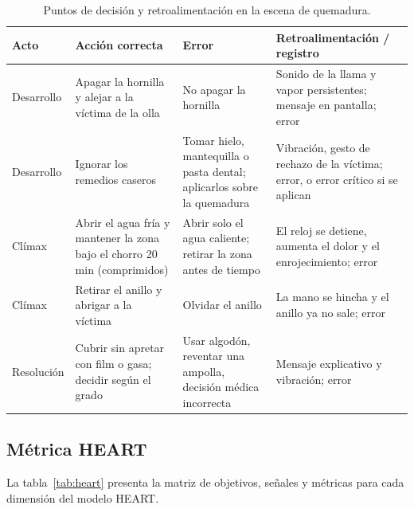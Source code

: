 \documentclass[11pt,letterpaper]{article}
\begin{document}
\begin{table}[H]
\centering
\small
\begin{tabularx}{\textwidth}{L{2.4cm} L{3.4cm} L{3.4cm} X}
\toprule
\textbf{Acto} & \textbf{Acción correcta} & \textbf{Error} & \textbf{Retroalimentación / registro} \\
\midrule
Desarrollo & Apagar la hornilla y alejar a la víctima de la olla & No apagar la hornilla & Sonido de la llama y vapor persistentes; mensaje en pantalla; error \\
\addlinespace
Desarrollo & Ignorar los remedios caseros & Tomar hielo, mantequilla o pasta dental; aplicarlos sobre la quemadura & Vibración, gesto de rechazo de la víctima; error, o error crítico si se aplican \\
\addlinespace
Clímax & Abrir el agua fría y mantener la zona bajo el chorro 20 min (comprimidos) & Abrir solo el agua caliente; retirar la zona antes de tiempo & El reloj se detiene, aumenta el dolor y el enrojecimiento; error \\
\addlinespace
Clímax & Retirar el anillo y abrigar a la víctima & Olvidar el anillo & La mano se hincha y el anillo ya no sale; error \\
\addlinespace
Resolución & Cubrir sin apretar con film o gasa; decidir según el grado & Usar algodón, reventar una ampolla, decisión médica incorrecta & Mensaje explicativo y vibración; error \\
\bottomrule
\end{tabularx}
\caption{Puntos de decisión y retroalimentación en la escena de quemadura.}
\label{tab:decisiones}
\end{table}

\subsection{Métrica HEART}

La tabla~\ref{tab:heart} presenta la matriz de objetivos, señales y métricas para cada dimensión del modelo HEART.
\end{document}
